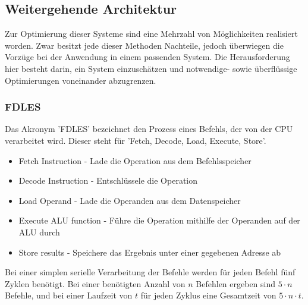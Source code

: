 \subsection{Weitergehende Architektur}\label{2.4}
Zur Optimierung dieser Systeme sind eine Mehrzahl von Möglichkeiten realisiert worden. Zwar besitzt jede dieser Methoden Nachteile, jedoch überwiegen die Vorzüge bei der Anwendung in einem passenden System. Die Herausforderung hier besteht darin, ein System einzuschätzen und notwendige- sowie überflüssige Optimierungen voneinander abzugrenzen.

\subsubsection{FDLES}
Das Akronym 'FDLES' bezeichnet den Prozess eines Befehls, der von der CPU verarbeitet wird. Dieser steht für 'Fetch, Decode, Load, Execute, Store'.

\begin{itemize}
\item Fetch Instruction - Lade die Operation aus dem Befehlsspeicher
\item Decode Instruction - Entschlüssele die Operation
\item Load Operand - Lade die Operanden aus dem Datenspeicher
\item Execute ALU function - Führe die Operation mithilfe der Operanden auf der ALU durch
\item Store results - Speichere das Ergebnis unter einer gegebenen Adresse ab 
\end{itemize}
Bei einer simplen serielle Verarbeitung der Befehle werden für jeden Befehl fünf Zyklen benötigt. Bei einer benötigten Anzahl von $n$ Befehlen ergeben sind $5\cdot n$ Befehle, und bei einer Laufzeit von $t$ für jeden Zyklus eine Gesamtzeit von $5\cdot n\cdot t$.
